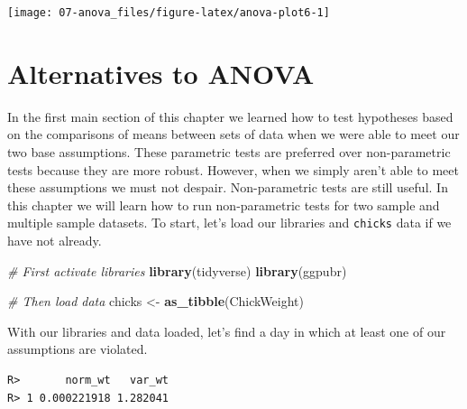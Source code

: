 \documentclass[english,10pt,a4paper,oneside]{book}
\newenvironment{Shaded}{\begin{snugshade}}{\end{snugshade}}
\newcommand{\KeywordTok}[1]{\textcolor[rgb]{0.13,0.29,0.53}{\textbf{#1}}}
\newcommand{\DataTypeTok}[1]{\textcolor[rgb]{0.13,0.29,0.53}{#1}}
\newcommand{\DecValTok}[1]{\textcolor[rgb]{0.00,0.00,0.81}{#1}}
\newcommand{\StringTok}[1]{\textcolor[rgb]{0.31,0.60,0.02}{#1}}
\newcommand{\CommentTok}[1]{\textcolor[rgb]{0.56,0.35,0.01}{\textit{#1}}}
\newcommand{\OperatorTok}[1]{\textcolor[rgb]{0.81,0.36,0.00}{\textbf{#1}}}
\newcommand{\NormalTok}[1]{#1}
\theoremstyle{definition}
\theoremstyle{definition}
\theoremstyle{definition}
\theoremstyle{remark}
\begin{document}
\texttt{[image: 07-anova\_files/figure-latex/anova-plot6-1]}

\section{Alternatives to ANOVA}\label{alternatives-to-anova}

In the first main section of this chapter we learned how to test
hypotheses based on the comparisons of means between sets of data when
we were able to meet our two base assumptions. These parametric tests
are preferred over non-parametric tests because they are more robust.
However, when we simply aren't able to meet these assumptions we must
not despair. Non-parametric tests are still useful. In this chapter we
will learn how to run non-parametric tests for two sample and multiple
sample datasets. To start, let's load our libraries and \texttt{chicks}
data if we have not already.

\begin{Shaded}
\begin{Highlighting}[]
\CommentTok{# First activate libraries}
\KeywordTok{library}\NormalTok{(tidyverse)}
\KeywordTok{library}\NormalTok{(ggpubr)}

\CommentTok{# Then load data}
\NormalTok{chicks <-}\StringTok{ }\KeywordTok{as_tibble}\NormalTok{(ChickWeight)}
\end{Highlighting}
\end{Shaded}

With our libraries and data loaded, let's find a day in which at least
one of our assumptions are violated.

\begin{Shaded}
\end{Shaded}

\begin{verbatim}
R>       norm_wt   var_wt
R> 1 0.000221918 1.282041
\end{verbatim}
\end{document}
